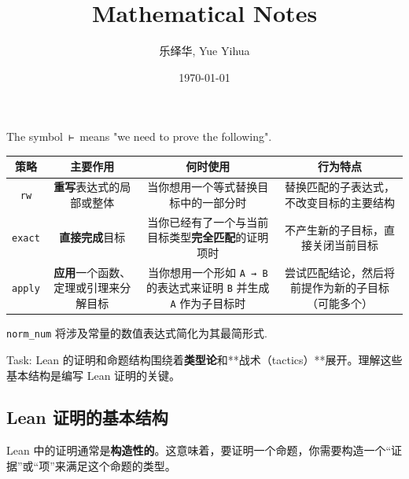 \documentclass{amsart}
\author{乐绎华, Yue Yihua}
\date{\today}
\title{Mathematical Notes}
\theoremstyle{plain}
\theoremstyle{definition}
\theoremstyle{remark}
\begin{document}
\maketitle
\tableofcontents

The symbol \lstinline{⊢} means "we need to prove the following".

\begin{table}[h]
	\centering
	\begin{tabular}{|c|c|c|c|}
		\hline
		策略 & 主要作用 & 何时使用 & 行为特点 \\
		\hline
		\lstinline{rw} & \textbf{重写}表达式的局部或整体 & 当你想用一个等式替换目标中的一部分时 & 替换匹配的子表达式，不改变目标的主要结构 \\
		\hline
		\lstinline{exact} & \textbf{直接完成}目标 & 当你已经有了一个与当前目标类型\textbf{完全匹配}的证明项时 & 不产生新的子目标，直接关闭当前目标 \\
		\hline
		\lstinline{apply} & \textbf{应用}一个函数、定理或引理来分解目标 & 当你想用一个形如 \lstinline{A → B} 的表达式来证明 \lstinline{B} 并生成 \lstinline{A} 作为子目标时 & 尝试匹配结论，然后将前提作为新的子目标（可能多个） \\
		\hline
	\end{tabular}
\end{table}
\lstinline{norm_num} 将涉及常量的数值表达式简化为其最简形式.

Task: Lean 的证明和命题结构围绕着\textbf{类型论}和**战术（tactics）**展开。理解这些基本结构是编写 Lean 证明的关键。

\subsection{Lean 证明的基本结构}

Lean 中的证明通常是\textbf{构造性的}。这意味着，要证明一个命题，你需要构造一个“证据”或“项”来满足这个命题的类型。
\end{document}

